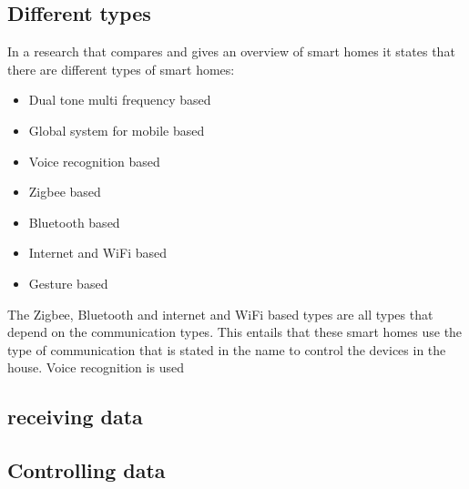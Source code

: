 \subsection{Different types}
In a research\cite{SmartHomecompare} that compares and gives an overview of smart homes it states that there are different types of smart homes:
\begin{itemize}
    \item Dual tone multi frequency based
    \item Global system for mobile based
    \item Voice recognition based
    \item Zigbee based
    \item Bluetooth based
    \item Internet and WiFi based
    \item Gesture based
\end{itemize}
The Zigbee, Bluetooth and internet and WiFi based types are all types that depend on the communication types. This entails that these smart homes use the type of communication that is stated in the name to control the devices in the house. Voice recognition is used 

\subsection{receiving data}
\label{ss:receiving_data_research}

\subsection{Controlling data}
\label{ss:controlling_data_research}
